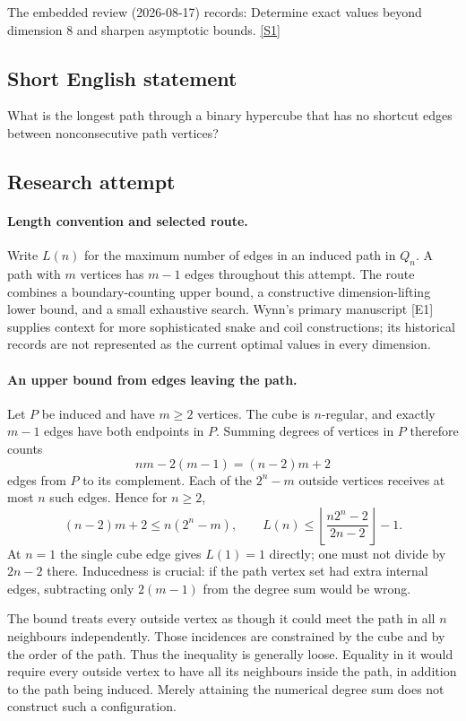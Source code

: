\documentclass[11pt,a4paper]{article}
\newcommand{\sref}[2]{\hyperlink{source:#1:#2}{[S#2]}}
\begin{document}
The embedded review (2026-08-17) records: Determine exact values beyond dimension 8 and sharpen asymptotic bounds. \sref{statement}{1}

\subsection{Short English statement}

What is the longest path through a binary hypercube that has no shortcut edges between nonconsecutive path vertices?

\subsection{Research attempt}

\paragraph{Length convention and selected route.}
Write $L(n)$ for the maximum number of edges in an induced path in
$Q_n$. A path with $m$ vertices has $m-1$ edges throughout this attempt.
The route combines a boundary-counting upper bound, a constructive
dimension-lifting lower bound, and a small exhaustive search. Wynn's
primary manuscript [E1] supplies context for more sophisticated snake
and coil constructions; its historical records are not represented as
the current optimal values in every dimension.

\paragraph{An upper bound from edges leaving the path.}
Let $P$ be induced and have $m\ge2$ vertices. The cube is $n$-regular,
and exactly $m-1$ edges have both endpoints in $P$. Summing degrees
of vertices in $P$ therefore counts
\[
                     nm-2(m-1)=(n-2)m+2
\]
edges from $P$ to its complement. Each of the $2^n-m$ outside
vertices receives at most $n$ such edges. Hence for $n\ge2$,
\[
 (n-2)m+2\le n(2^n-m),\qquad
 L(n)\le\left\lfloor\frac{n2^n-2}{2n-2}\right\rfloor-1.
\]
At $n=1$ the single cube edge gives $L(1)=1$ directly; one must not
divide by $2n-2$ there. Inducedness is crucial: if the path vertex
set had extra internal edges, subtracting only $2(m-1)$ from the
degree sum would be wrong.

The bound treats every outside vertex as though it could meet the path
in all $n$ neighbours independently. Those incidences are constrained
by the cube and by the order of the path. Thus the inequality is
generally loose. Equality in it would require every outside vertex
to have all its neighbours inside the path, in addition to the path
being induced. Merely attaining the numerical degree sum does not
construct such a configuration.
\end{document}
